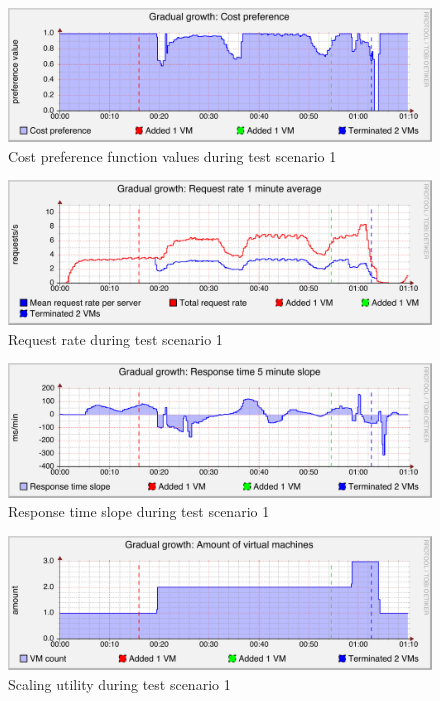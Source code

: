 \documentclass[english]{tktltiki2}
\theoremstyle{definition}
\theoremstyle{remark}
\begin{document}
\begin{figure}[htbp]
	\includegraphics[width=\textwidth]{images/costpreferencegraph-test21}
	\caption{Cost preference function values during test scenario 1}
	\label{fig:costPreferenceScenario1}
\end{figure}

\begin{figure}[htbp]
	\includegraphics[width=\textwidth]{images/requestrategraph-test21}
	\caption{Request rate during test scenario 1}
	\label{fig:requestRateScenario1}
\end{figure}

\begin{figure}[htbp]
	\includegraphics[width=\textwidth]{images/responsetimeslopegraph-test21}
	\caption{Response time slope during test scenario 1}
	\label{fig:responseTimeSlopeScenario1}
\end{figure}

\begin{figure}[htbp]
	\includegraphics[width=\textwidth]{images/vmcountgraph-test21}
	\caption{Scaling utility during test scenario 1}
	\label{fig:vmCountScenario1}
\end{figure}
\end{document}
